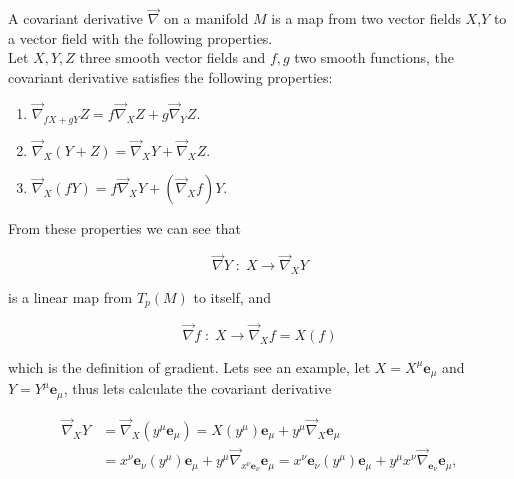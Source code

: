         \begin{myDef}
            A covariant derivative $\Vec{\nabla}$ on a manifold $M$ is a map from two vector fields $X$,$Y$ to a vector field with the following properties.\\

            Let $X,Y,Z$ three smooth vector fields and $f,g$ two smooth functions, the covariant derivative satisfies the following properties:

            \begin{enumerate}
                \item $\Vec{\nabla}_{fX+gY}Z = f\Vec{\nabla}_XZ + g\Vec{\nabla}_YZ.$

                \item $\Vec{\nabla}_X(Y+Z) = \Vec{\nabla}_XY+\Vec{\nabla}_XZ$.

                \item $\Vec{\nabla}_X(fY) = f\Vec{\nabla}_XY + \left(\Vec{\nabla}_Xf\right)Y$.
            \end{enumerate}
        \end{myDef}

        From these properties we can see that 

        \begin{equation}
            \Vec{\nabla}Y\;:\; X\rightarrow \Vec{\nabla}_XY
        \end{equation}

        is a linear map from $T_p(M)$ to itself, and 

        \begin{equation}
            \Vec{\nabla}f\;:\; X \rightarrow \Vec{\nabla}_Xf = X(f)
        \end{equation}

        which is the definition of gradient. Lets see an example, let $X = X^{\mu}\mathbf{e}_{\mu}$ and $Y = Y^{\mu}\mathbf{e}_{\mu}$, thus lets calculate the covariant derivative

        \begin{align*}
            \Vec{\nabla}_XY &= \Vec{\nabla}_X\left(y^{\mu}\mathbf{e}_{\mu}\right) = X\left(y^{\mu}\right)\mathbf{e}_{\mu} + y^{\mu}\Vec{\nabla}_X\mathbf{e}_{\mu}\\
            &= x^{\nu}\mathbf{e}_{\nu}(y^{\mu})\mathbf{e}_{\mu}+y^{\mu}\Vec{\nabla}_{x^\nu\mathbf{e}_{\nu}}\mathbf{e}_{\mu} = x^{\nu}\textbf{e}_{\nu}(y^{\mu})\mathbf{e}_{\mu} + y^{\mu}x^{\nu}\Vec{\nabla}_{\mathbf{e}_{\nu}}\mathbf{e}_{\mu},
        \end{align*}

